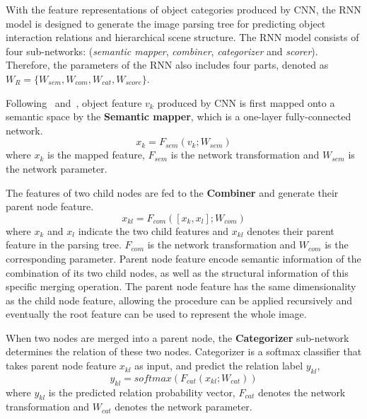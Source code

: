 \documentclass[10pt,twocolumn,letterpaper]{article}
\begin{document}

With the feature representations of object categories produced by CNN, the RNN model is designed to generate the image parsing tree for predicting object interaction relations and hierarchical scene structure. The RNN model consists of four sub-networks: (\textit{semantic mapper}, \textit{combiner}, \textit{categorizer} and \textit{scorer}). Therefore, the parameters of the RNN also includes four parts, denoted as $W_R=\{W_{sem},W_{com},W_{cat},W_{score}\}$.

Following~\cite{DBLP:Recursive_Socher} and~\cite{DBLP:RecursiveContext2}, object feature $v_k$ produced by CNN is first mapped onto a semantic space by the \textbf{Semantic mapper}, which is a one-layer fully-connected network.
\begin{equation}\label{eq_sem}
x_k = F_{sem}(v_k;W_{sem})
\end{equation}
where $x_k$ is the mapped feature, $F_{sem}$ is the network transformation and $W_{sem}$ is the network parameter.

The features of two child nodes are fed to the \textbf{Combiner} and generate their parent node feature.
\begin{equation}\label{eq_com}
x_{kl} = F_{com}([x_k,x_l];W_{com})
\end{equation}
where $x_k$ and $x_l$ indicate the two child features and $x_{kl}$ denotes their parent feature in the parsing tree. $F_{com}$ is the network transformation and $W_{com}$ is the corresponding parameter. Parent node feature encode semantic information of the combination of its two child nodes, as well as the structural information of this specific merging operation. The parent node feature has the same dimensionality as the child node feature, allowing the procedure can be applied recursively and eventually the root feature can be used to represent the whole image.

When two nodes are merged into a parent node, the \textbf{Categorizer} sub-network determines the relation of these two nodes. Categorizer is a softmax classifier that takes parent node feature $x_{kl}$ as input, and predict the relation label $y_{kl}$,
\begin{equation}\label{eq_rel_category}
y_{kl} = softmax(F_{cat}(x_{kl};W_{cat}))
\end{equation}
where $y_{kl}$ is the predicted relation probability vector, $F_{cat}$ denotes the network transformation and $W_{cat}$ denotes the network parameter.
\end{document}
